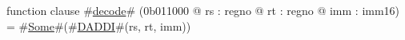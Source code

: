 function clause #\hyperref[zdecode]{decode}# (0b011000 @ rs : regno @ rt : regno @ imm : imm16) =
  #\hyperref[zSome]{Some}#(#\hyperref[zDADDI]{DADDI}#(rs, rt, imm))
